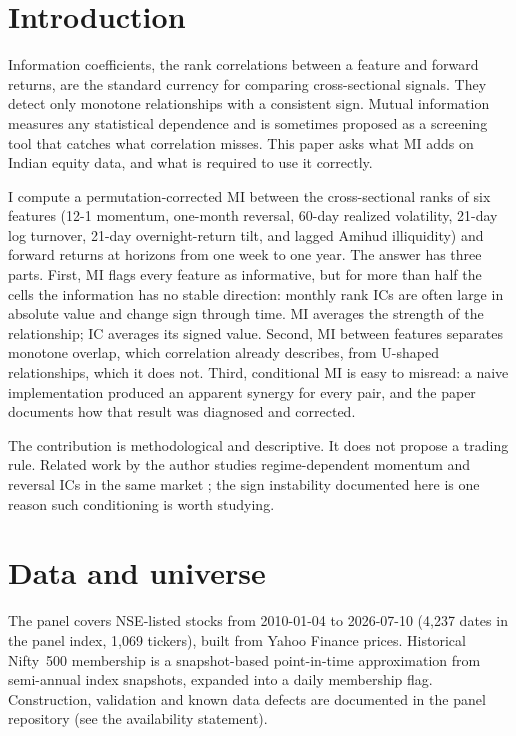 \documentclass[11pt]{article}
\begin{document}
\section{Introduction}

Information coefficients, the rank correlations between a feature and forward
returns, are the standard currency for comparing cross-sectional signals. They detect
only monotone relationships with a consistent sign. Mutual information measures any
statistical dependence and is sometimes proposed as a screening tool that catches what
correlation misses. This paper asks what MI adds on Indian equity data, and what is
required to use it correctly.

I compute a permutation-corrected MI between the cross-sectional ranks of six features
(12-1 momentum, one-month reversal, 60-day realized volatility, 21-day log turnover,
21-day overnight-return tilt, and lagged Amihud illiquidity) and forward returns at
horizons from one week to one year. The answer has three parts. First, MI flags every
feature as informative, but for more than half the cells the information has no stable
direction: monthly rank ICs are often large in absolute value and change sign through
time. MI averages the strength of the relationship; IC averages its signed value.
Second, MI between features separates monotone overlap, which correlation already
describes, from U-shaped relationships, which it does not. Third, conditional MI is
easy to misread: a naive implementation produced an apparent synergy for every pair,
and the paper documents how that result was diagnosed and corrected.

The contribution is methodological and descriptive. It does not propose a trading
rule. Related work by the author studies regime-dependent momentum and reversal ICs in
the same market \citep{sahi_irfa}; the sign instability documented here is one reason
such conditioning is worth studying.

\section{Data and universe}
\label{sec:data}

The panel covers NSE-listed stocks from 2010-01-04 to 2026-07-10 (4,237 dates in the
panel index, 1,069 tickers), built from Yahoo Finance prices. Historical Nifty~500
membership is a snapshot-based point-in-time approximation from semi-annual index
snapshots, expanded into a daily membership flag. Construction, validation and known
data defects are documented in the panel repository (see the availability statement).
\end{document}

